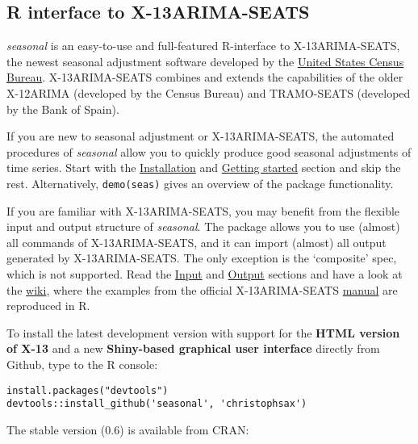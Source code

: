 \subsection{R interface to
X-13ARIMA-SEATS}\label{r-interface-to-x-13arima-seats}

\emph{seasonal} is an easy-to-use and full-featured R-interface to
X-13ARIMA-SEATS, the newest seasonal adjustment software developed by
the \href{http://www.census.gov/srd/www/x13as/}{United States Census
Bureau}. X-13ARIMA-SEATS combines and extends the capabilities of the
older X-12ARIMA (developed by the Census Bureau) and TRAMO-SEATS
(developed by the Bank of Spain).

If you are new to seasonal adjustment or X-13ARIMA-SEATS, the automated
procedures of \emph{seasonal} allow you to quickly produce good seasonal
adjustments of time series. Start with the
\hyperref[installation]{Installation} and
\hyperref[getting-started]{Getting started} section and skip the rest.
Alternatively, \texttt{demo(seas)} gives an overview of the package
functionality.

If you are familiar with X-13ARIMA-SEATS, you may benefit from the
flexible input and output structure of \emph{seasonal}. The package
allows you to use (almost) all commands of X-13ARIMA-SEATS, and it can
import (almost) all output generated by X-13ARIMA-SEATS. The only
exception is the `composite' spec, which is not supported. Read the
\hyperref[input]{Input} and \hyperref[output]{Output} sections and have
a look at the
\href{https://github.com/christophsax/seasonal/wiki/Examples-of-X-13ARIMA-SEATS-in-R}{wiki},
where the examples from the official X-13ARIMA-SEATS
\href{http://www.census.gov/ts/x13as/docX13AS.pdf}{manual} are
reproduced in R.


To install the latest development version with support for the
\textbf{HTML version of X-13} and a new \textbf{Shiny-based graphical
user interface} directly from Github, type to the R console:

\begin{verbatim}
install.packages("devtools")
devtools::install_github('seasonal', 'christophsax')
\end{verbatim}

The stable version (0.6) is available from CRAN:

